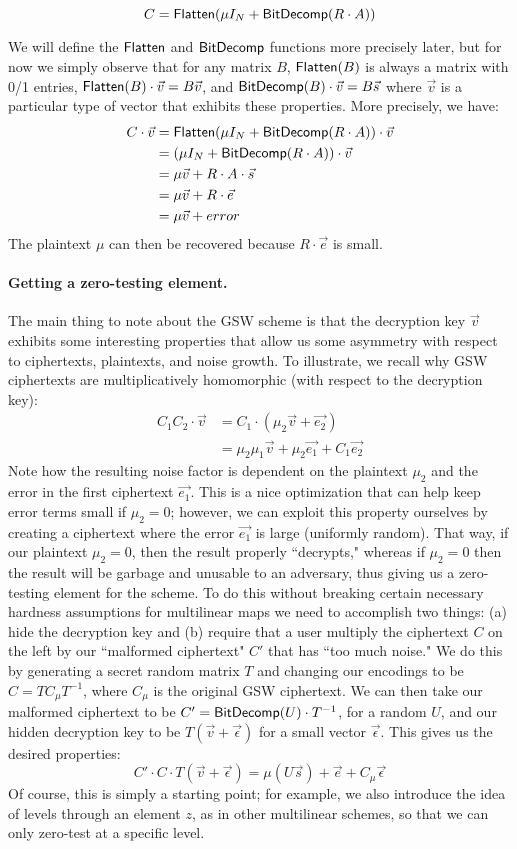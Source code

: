 $$C = \mathsf{Flatten}(\mu I_N + \mathsf{BitDecomp}(R\cdot A))$$

We will define the $\mathsf{Flatten}$ and $\mathsf{BitDecomp}$ functions more precisely later, but for now we simply observe that for any matrix $B$, $\mathsf{Flatten}(B)$ is always a matrix with 0/1 entries, $\mathsf{Flatten}(B)\cdot \vec{v} = B\vec{v}$, and $\mathsf{BitDecomp}(B)\cdot \vec{v} = B\vec{s}$ where $\vec{v}$ is a particular type of vector that exhibits these properties.  More precisely, we have:
\begin{align*}
C\cdot \vec{v} &= \mathsf{Flatten}(\mu I_N + \mathsf{BitDecomp}(R\cdot A))\cdot \vec{v}\\
&= (\mu I_N + \mathsf{BitDecomp}(R\cdot A))\cdot \vec{v}\\
&= \mu \vec{v} + R\cdot A \cdot \vec{s} \\
&= \mu \vec{v} + R\cdot \vec{e}\\
&= \mu \vec{v} + error
\end{align*}
The plaintext $\mu$ can then be recovered because $R\cdot \vec{e}$ is small.    

\paragraph{Getting a zero-testing element.}
The main thing to note about the GSW scheme is that the decryption key $\vec{v}$ exhibits some interesting properties that allow us some asymmetry with respect to ciphertexts, plaintexts, and noise growth.  To illustrate, we recall why GSW ciphertexts are multiplicatively homomorphic (with respect to the decryption key):
\begin{align*}
C_1C_2\cdot \vec{v} &= C_1\cdot (\mu_2 \vec{v} + \vec{e_2})\\
&= \mu_2\mu_1 \vec{v} + \mu_2\vec{e_1}+ C_1\vec{e_2}
\end{align*}
Note how the resulting noise factor is dependent on the plaintext $\mu_2$ and the error in the first ciphertext $\vec{e_1}$.  This is a nice optimization that can help keep error terms small if $\mu_2 = 0$; however, we can exploit this property ourselves by creating a ciphertext where the error $\vec{e_1}$ is large (uniformly random).  That way, if our plaintext $\mu_2 = 0$, then the result properly ``decrypts," whereas if $\mu_2 = 0$ then the result will be garbage and unusable to an adversary, thus giving us a zero-testing element for the scheme.  To do this without breaking certain necessary hardness assumptions for multilinear maps we need to accomplish two things: (a) hide the decryption key and (b) require that a user multiply the ciphertext $C$ on the left by our ``malformed ciphertext" $C'$ that has ``too much noise."  We do this by generating a secret random matrix $T$ and changing our encodings to be $C = TC_\mu T^{-1}$, where $C_\mu$ is the original GSW ciphertext.  We can then take our malformed ciphertext to be $C' = \mathsf{BitDecomp}(U)\cdot T^{-1}$, for a random $U$, and our hidden decryption key to be $T(\vec{v} + \vec{\epsilon})$ for a small vector $\vec{\epsilon}$.  This gives us the desired properties:
$$C'\cdot C \cdot T(\vec{v} + \vec{\epsilon}) = \mu (U\vec{s}) + \vec{e} + C_\mu\vec{\epsilon}$$
Of course, this is simply a starting point; for example, we also introduce the idea of levels through an element $z$, as in other multilinear schemes, so that we can only zero-test at a specific level.
